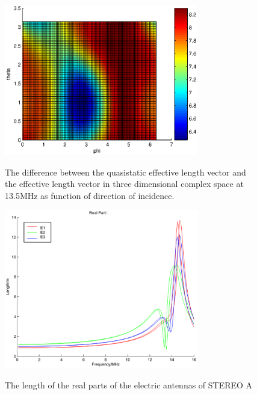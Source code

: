 \documentclass[galley,ras]{agu2001}
\begin{document}
\begin{article}
\begin{figure}
\noindent \includegraphics[width=20pc]{heff_length_variation13.5MHz_6d.eps} \\
\caption{The difference between the quasistatic effective length vector and the effective length vector in three dimensional complex space at 13.5MHz as function of direction of incidence.}\label{fig_heff_dist_6d_13.5MHz_caps}
\end{figure}



\begin{figure}
\noindent \includegraphics[width=20pc]{HeffLengthRealD2_caps.eps} \\
\caption{The length of the real parts of the electric antennas of STEREO A} \label{fig_Heff_length_real_caps_D2}
\end{figure}


\end{article}
\end{document}
